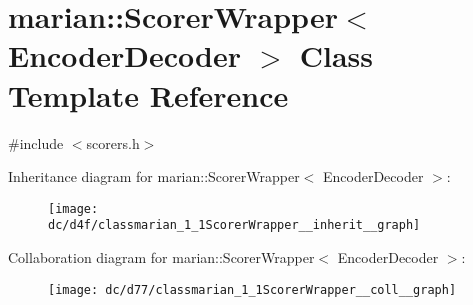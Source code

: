 \hypertarget{classmarian_1_1ScorerWrapper}{}\section{marian\+:\+:Scorer\+Wrapper$<$ Encoder\+Decoder $>$ Class Template Reference}
\label{classmarian_1_1ScorerWrapper}


{\ttfamily \#include $<$scorers.\+h$>$}



Inheritance diagram for marian\+:\+:Scorer\+Wrapper$<$ Encoder\+Decoder $>$\+:
\nopagebreak
\begin{figure}[H]
\begin{center}
\leavevmode
\texttt{[image: dc/d4f/classmarian\_1\_1ScorerWrapper\_\_inherit\_\_graph]}
\end{center}
\end{figure}


Collaboration diagram for marian\+:\+:Scorer\+Wrapper$<$ Encoder\+Decoder $>$\+:
\nopagebreak
\begin{figure}[H]
\begin{center}
\leavevmode
\texttt{[image: dc/d77/classmarian\_1\_1ScorerWrapper\_\_coll\_\_graph]}
\end{center}
\end{figure}
